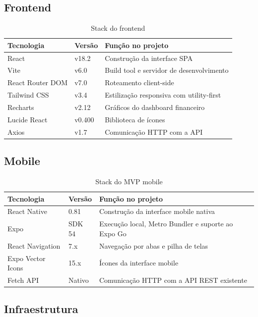 \documentclass[12pt, a4paper]{article}
\newcommand{\thead}[1]{\cellcolor{tableheader}\color{white}\bfseries #1}
\newcommand{\talt}{\rowcolor{tablerowalt}}
\begin{document}
\subsection{Frontend}

\begin{table}[H]
\centering
\begin{tabularx}{\textwidth}{|l|l|X|}
\hline
\thead{Tecnologia} & \thead{Versão} & \thead{Função no projeto} \\
\hline
React           & v18.2  & Construção da interface SPA \\
\talt Vite           & v6.0   & Build tool e servidor de desenvolvimento \\
React Router DOM & v7.0  & Roteamento client-side \\
\talt Tailwind CSS  & v3.4   & Estilização responsiva com utility-first \\
Recharts        & v2.12  & Gráficos do dashboard financeiro \\
\talt Lucide React  & v0.400 & Biblioteca de ícones \\
Axios           & v1.7   & Comunicação HTTP com a API \\
\hline
\end{tabularx}
\caption{Stack do frontend}
\end{table}

\subsection{Mobile}

\begin{table}[H]
\centering
\begin{tabularx}{\textwidth}{|l|l|X|}
\hline
\thead{Tecnologia} & \thead{Versão} & \thead{Função no projeto} \\
\hline
React Native & 0.81 & Construção da interface mobile nativa \\
\talt Expo & SDK 54 & Execução local, Metro Bundler e suporte ao Expo Go \\
React Navigation & 7.x & Navegação por abas e pilha de telas \\
\talt Expo Vector Icons & 15.x & Ícones da interface mobile \\
Fetch API & Nativo & Comunicação HTTP com a API REST existente \\
\hline
\end{tabularx}
\caption{Stack do MVP mobile}
\end{table}

\subsection{Infraestrutura}
\end{document}
